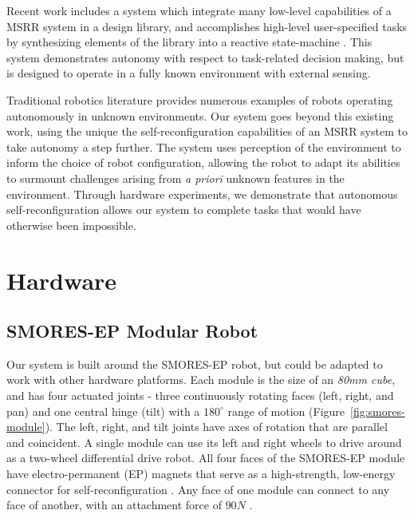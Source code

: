 \documentclass[conference]{IEEEtran}
\begin{document}

Recent work includes a system which integrate many low-level capabilities of a MSRR system in a design library, and accomplishes high-level user-specified tasks by synthesizing elements of the library into a reactive state-machine \cite{Jing2016}. This system demonstrates autonomy with respect to task-related decision making, but is designed to operate in a fully known environment with external sensing.

Traditional robotics literature provides numerous examples of robots operating autonomously in unknown environments. Our system goes beyond this existing work, using the unique the self-reconfiguration capabilities of an MSRR system to take autonomy a step further.  The system uses perception of the environment  to inform the choice of robot configuration, allowing the robot to adapt its abilities to surmount challenges arising from \textit{a priori} unknown features in the environment. Through hardware experiments, we demonstrate that autonomous self-reconfiguration allows our system to complete tasks that would have otherwise been impossible.

\section{Hardware} %
\label{sec:hardware}
%
\subsection{SMORES-EP Modular Robot} \label{sec:smores}
%
Our system is built around the SMORES-EP robot, but could be adapted to
work with other hardware platforms. Each module is the size of an \textit{80mm cube}, and has four actuated joints - three continuously rotating faces (left, right, and
pan)  and one central hinge (tilt) with a \(180^\circ\) range of motion
(Figure~\ref{fig:smores-module}). The left, right, and tilt joints have
 axes of rotation that are parallel and coincident. A single module can use its
left and right wheels to drive around as a two-wheel differential drive robot.
All four faces of the SMORES-EP module have electro-permanent (EP) magnets
that serve as a high-strength, low-energy connector for self-reconfiguration
\cite{tosun2016design}.  Any face of one module can connect to any face of
another, with an attachment force of $90N$ \cite{tosun2016design}. 
\end{document}
